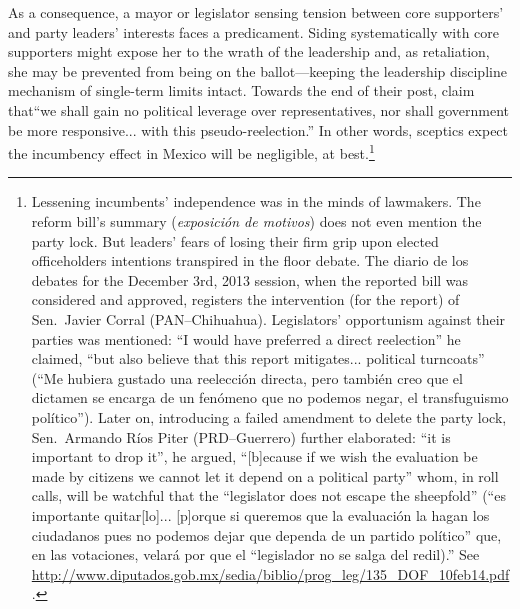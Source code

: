 \documentclass[letter,12pt]{article}
\begin{document}
As a consequence, a mayor or legislator sensing tension between core supporters' and party leaders' interests faces a predicament. Siding systematically with core supporters might expose her to the wrath of the leadership and, as retaliation, she may be prevented from being on the ballot---keeping the leadership discipline mechanism of single-term limits \citep{weldon.1997} intact. Towards the end of their post, \citet{merinoFierroZarkin2013Blog} claim that``we shall gain no political leverage over representatives, nor shall government be more responsive... with this pseudo-reelection.'' In other words, sceptics expect the incumbency effect in Mexico will be negligible, at best.\footnote{Lessening incumbents' independence was in the minds of lawmakers. The reform bill's summary (\emph{exposición de motivos}) does not even mention the party lock. But leaders' fears of losing their firm grip upon elected officeholders intentions transpired in the floor debate. The diario de los debates for the December 3rd, 2013 session, when the reported bill was considered and approved, registers the intervention (for the report) of Sen.\ Javier Corral (PAN--Chihuahua). Legislators' opportunism against their parties was mentioned: ``I would have preferred a direct reelection'' he claimed, ``but also believe that this report mitigates... political turncoats'' (``Me hubiera gustado una reelección directa, pero también creo que el dictamen se encarga de un fenómeno que no podemos negar, el transfuguismo político''). Later on, introducing a failed amendment to delete the party lock, Sen.\ Armando Ríos Piter (PRD--Guerrero) further elaborated: ``it is important to drop it'', he argued, ``[b]ecause if we wish the evaluation be made by citizens we cannot let it depend on a political party'' whom, in roll calls, will be watchful that the ``legislator does not escape the sheepfold'' (``es importante quitar[lo]... [p]orque si queremos que la evaluación la hagan los ciudadanos pues no podemos dejar que dependa de un partido político'' que, en las votaciones, velará por que el ``legislador no se salga del redil).'' See \url{http://www.diputados.gob.mx/sedia/biblio/prog_leg/135_DOF_10feb14.pdf}.}

\end{document}
